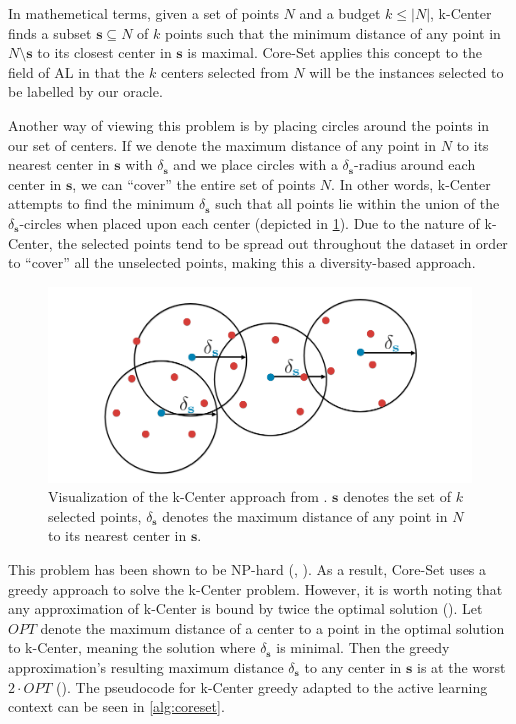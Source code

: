 \documentclass[english,bachelor,ul]{webisthesis} %
\begin{document}
In mathemetical terms, given a set of points $ N $ and a budget $ k \leq |N| $, k-Center finds a subset $ \mathbf{s} \subseteq N $ of $ k $ points such that the minimum distance of any point in $ N \setminus \mathbf{s} $ to its closest center in $ \mathbf{s} $ is maximal. Core-Set applies this concept to the field of AL in that the $ k $ centers selected from $ N $ will be the instances selected to be labelled by our oracle.

Another way of viewing this problem is by placing circles around the points in our set of centers. If we denote the maximum distance of any point in $ N $ to its nearest center in $ \mathbf{s} $ with $ \delta_{\mathbf{s}} $ and we place circles with a $ \delta_{\mathbf{s}} $-radius around each center in $ \mathbf{s} $, we can ``cover'' the entire set of points $ N $. In other words, k-Center attempts to find the minimum $ \delta_{\mathbf{s}} $ such that all points lie within the union of the $ \delta_{\mathbf{s}} $-circles when placed upon each center (depicted in \ref{fig:coreset}). Due to the nature of k-Center, the selected points tend to be spread out throughout the dataset in order to ``cover'' all the unselected points, making this a diversity-based approach. 

\begin{figure}[htbp]
    \centering
    \includegraphics[width=1\textwidth]{img/core-set.png}
    \caption{Visualization of the k-Center approach from \cite{DBLP:conf/iclr/SenerS18}. $ \mathbf{s} $ denotes the set of $ k $ selected points, $ \delta_{\mathbf{s}} $ denotes the maximum distance of any point in $ N $ to its nearest center in $ \mathbf{s} $.}
    \label{fig:coreset}
\end{figure}

This problem has been shown to be NP-hard (\cite{DBLP:journals/dam/HsuN79}, \cite{DBLP:journals/anor/Hochbaum84}). As a result, Core-Set uses a greedy approach to solve the k-Center problem. However, it is worth noting that any approximation of k-Center is bound by twice the optimal solution (\cite{DBLP:journals/dam/HsuN79}). Let $ OPT $ denote the maximum distance of a center to a point in the optimal solution to k-Center, meaning the solution where $\delta_{\mathbf{s}} $ is minimal. Then the greedy approximation's resulting maximum distance $ \delta_{\mathbf{s}} $ to any center in $ \mathbf{s} $ is at the worst $ 2 \cdot OPT $ (\cite{mountkcenter}). The pseudocode for k-Center greedy adapted to the active learning context can be seen in \ref{alg:coreset}.
\end{document}

